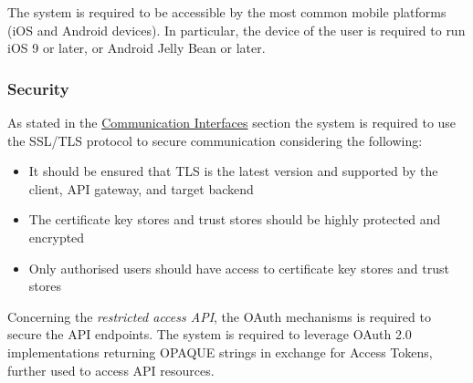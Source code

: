 	The system is required to be accessible by the most common mobile platforms (iOS and Android devices). In particular, the device of the user is required to run iOS 9 or later, or Android Jelly Bean or later.

\subsubsection{Security}

As stated in the \hyperref[sec:ci]{Communication Interfaces} section the system is required to use the SSL/TLS protocol to secure communication considering the following:

	\begin{itemize}
		\item It should be ensured that TLS is the latest version and supported by the client, API gateway, and target backend
		\item The certificate key stores and trust stores should be highly protected and encrypted
		\item Only authorised users should have access to certificate key stores and trust stores
	\end{itemize}

Concerning the \emph{restricted access API}, the OAuth mechanisms is required to secure the API endpoints. The system is required to leverage OAuth 2.0 implementations returning OPAQUE strings in exchange for Access Tokens, further used to access API resources.



\clearpage